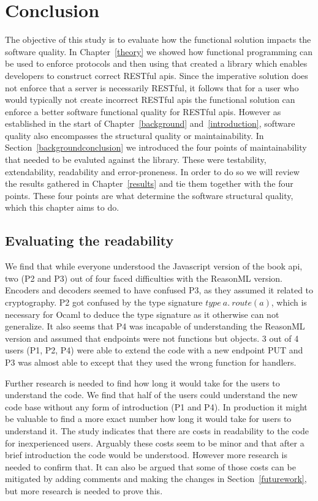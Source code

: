 \chapter{Conclusion}\label{conclusion}

 The objective of this study is to evaluate how the functional solution impacts
 the software quality. In Chapter~\ref{theory} we showed how functional
 programming can be used to enforce protocols and then using that created a
 library which enables developers to construct correct RESTful apis. Since the
 imperative solution does not enforce that a server is necessarily RESTful, it
 follows that for a user who would typically not create incorrect RESTful apis
 the functional solution can enforce a better software functional quality for
 RESTful apis. However as established in the start of Chapter~\ref{background}
 and~\ref{introduction}, software quality also encompasses the structural
 quality or maintainability. In Section~\ref{backgroundconclusion} we introduced
 the four points of maintainability that needed to be evaluted against the
 library. These were testability, extendability, readability and
 error-proneness. In order to do so we will review the results gathered in
 Chapter~\ref{results} and tie them together with the four points. These four
 points are what determine the software structural quality, which this chapter
 aims to do.

\section{Evaluating the readability}

We find that while everyone understood the Javascript version of the book api,
two (P2 and P3) out of four faced difficulties with the ReasonML version.
Encoders and decoders seemed to have confused P3, as they assumed it related to
cryptography. P2 got confused by the type signature $type\ a.\ route(a)$, which
is necessary for Ocaml to deduce the type signature as it otherwise can not
generalize. It also seems that P4 was incapable of understanding the ReasonML
version and assumed that endpoints were not functions but objects.  3 out of 4
users (P1, P2, P4) were able to extend the code with a new endpoint PUT and P3
was almost able to except that they used the wrong function for handlers.

Further research is needed to find how long it would take for the users to
understand the code. We find that half of the users could understand the new
code base without any form of introduction (P1 and P4). In production it might
be valuable to find a more exact number how long it would take for users to
understand it.  The study indicates that there are costs in readability to the
code for inexperienced users. Arguably these costs seem to be minor and that
after a brief introduction the code would be understood. However more research
is needed to confirm that. It can also be argued that some of those costs can be
mitigated by adding comments and making the changes in Section~\ref{futurework},
but more research is needed to prove this.

